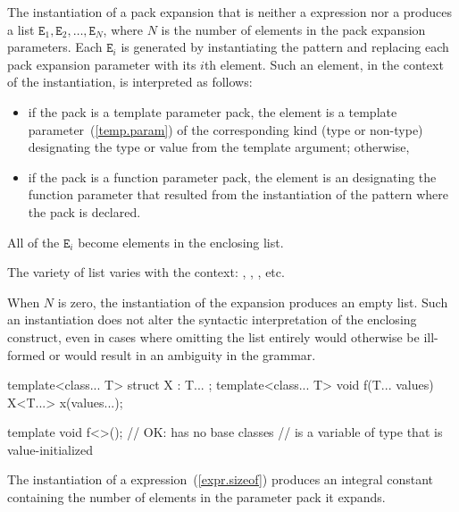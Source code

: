 \pnum
The instantiation of a pack expansion
that is neither a  expression
nor a 
produces a
list
$\mathtt{E}_1, \mathtt{E}_2, \dotsc, \mathtt{E}_N$,
where
$N$ is the number of elements in the pack expansion parameters. Each
$\mathtt{E}_i$ is generated by instantiating the pattern and
replacing each pack expansion parameter with its $i$th element.
Such an element, in the context of the instantiation, is interpreted as
follows:

\begin{itemize}
\item
if the pack is a template parameter pack, the element is a template
parameter~(\ref{temp.param}) of the corresponding kind (type or
non-type) designating the type or value from the template
argument; otherwise,

\item
if the pack is a function parameter pack, the element is an
designating the function parameter that resulted from
the instantiation of the pattern where the pack is declared.
\end{itemize}

All of the $\mathtt{E}_i$ become elements in the enclosing list.
\begin{note} The variety of list varies with the context:
,
,
, etc.\end{note}
When $N$ is zero, the instantiation of the expansion produces an empty list.
Such an instantiation does not alter the syntactic interpretation of the
enclosing construct, even in cases where omitting the list entirely would
otherwise be ill-formed or would result in an ambiguity in the grammar.
\begin{example}
\begin{codeblock}
template<class... T> struct X : T... { };
template<class... T> void f(T... values) {
  X<T...> x(values...);
}

template void f<>();  // OK:  has no base classes
                      //  is a variable of type  that is value-initialized
\end{codeblock}
\end{example}

\pnum
The instantiation of a  expression~(\ref{expr.sizeof}) produces
an integral constant containing the number of elements in the parameter pack
it expands.

